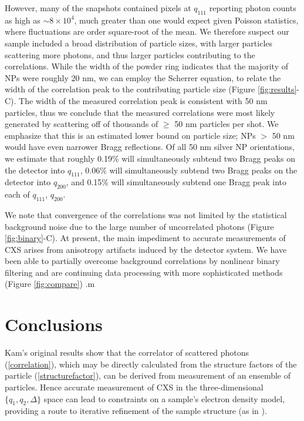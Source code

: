 \documentclass [11pt,fleqn]{article}
\begin{document}
However, many of the snapshots contained pixels at $q_{111}$ reporting photon counts as high as $\sim 8 \times 10^4$, much greater than one would expect given Poisson statistics, where fluctuations are order square-root of the mean. We therefore suspect our sample included a broad distribution of particle sizes, with larger particles scattering more photons, and thus larger particles contributing to the correlations. While the width of the powder ring indicates that the majority of NPs were roughly 20 nm, we can employ the Scherrer equation, to relate the width of the correlation peak to the contributing particle size (Figure \ref{fig:results}-C). The width of the measured correlation peak is consistent with 50 nm particles, thus we conclude that the measured correlations were most likely generated by scattering off of thousands of $\ge$ 50 nm particles per shot. We emphasize that this is an estimated lower bound on particle size;  NPs $>$ 50 nm would have even narrower Bragg reflections. Of all 50 nm silver NP orientations, we estimate that roughly 0.19\% will simultaneously subtend two Bragg peaks on the detector into $q_{111}$, 0.06\% will simultaneously subtend two Bragg peaks on the detector into $q_{200}$, and 0.15\% will simultaneously subtend one Bragg peak into each of $q_{111}$, $q_{200}$.

We note that convergence of the correlations was not limited by the statistical background noise due to the large number of uncorrelated photons (Figure \ref{fig:binary}-C). At present, the main impediment to accurate measurements of CXS arises from anisotropy artifacts induced by the detector system.  We have been able to partially overcome background correlations by nonlinear binary filtering and are continuing data processing with more sophisticated methods (Figure \ref{fig:compare}) .m

\section{Conclusions}

Kam's original results \cite{Kam:1977wc} show that the correlator of scattered photons (\ref{correlation}), which may be directly calculated from the structure factors of the particle (\ref{structurefactor}), can be derived from measurement of an ensemble of particles. Hence accurate measurement of CXS in the three-dimensional $\{q_1,q_2,\Delta\}$ space can lead to constraints on a sample's electron density model, providing a route to iterative refinement of the sample structure (as in \cite{Schroder:2010cm}).
\end{document}
